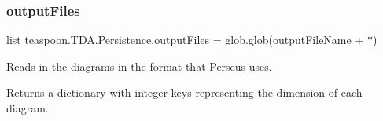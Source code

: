 \subsubsection{\texorpdfstring{output\+Files}{outputFiles}}
{\footnotesize\ttfamily list teaspoon.\+T\+D\+A.\+Persistence.\+output\+Files = glob.\+glob(output\+File\+Name + \textquotesingle{}$\ast$\textquotesingle{})}



Reads in the diagrams in the format that Perseus uses. 

Returns a dictionary with integer keys representing the dimension of each diagram. 